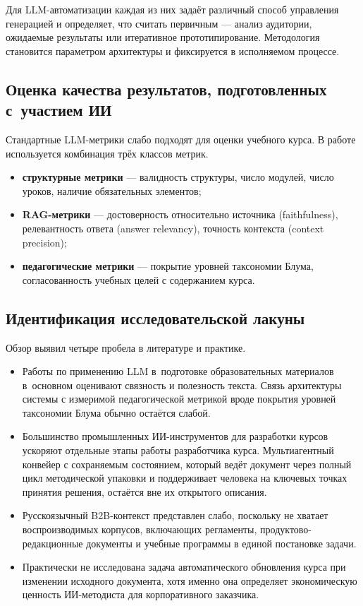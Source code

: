 Для LLM-автоматизации каждая из них задаёт различный способ управления
генерацией и определяет, что считать первичным — анализ аудитории,
ожидаемые результаты или итеративное прототипирование.
Методология становится параметром архитектуры и фиксируется в исполняемом процессе.

\subsection{Оценка качества результатов, подготовленных с~участием ИИ}

Стандартные LLM-метрики слабо подходят для оценки
учебного курса. В работе используется комбинация трёх классов метрик.

\begin{itemize}
  \item \textbf{структурные метрики} — валидность структуры, число модулей,
    число уроков, наличие обязательных элементов;
  \item \textbf{RAG-метрики} — достоверность относительно источника
    (faithfulness), релевантность ответа (answer relevancy),
    точность контекста (context precision);
  \item \textbf{педагогические метрики} — покрытие уровней таксономии
    Блума, согласованность учебных целей с содержанием курса.
\end{itemize}

\subsection{Идентификация исследовательской лакуны}

Обзор выявил четыре пробела в литературе и практике.

\begin{itemize}
  \item Работы по применению LLM в~подготовке образовательных материалов в~основном
    оценивают связность и полезность текста. Связь архитектуры системы
    с измеримой педагогической метрикой вроде покрытия уровней таксономии
    Блума обычно остаётся слабой.
  \item Большинство промышленных ИИ-инструментов для разработки курсов
    ускоряют отдельные этапы работы разработчика курса. Мультиагентный
    конвейер с сохраняемым состоянием, который ведёт документ через полный цикл
    методической упаковки и поддерживает человека на ключевых точках принятия решения,
    остаётся вне их открытого описания.
  \item Русскоязычный B2B-контекст представлен слабо, поскольку не хватает
    воспроизводимых корпусов, включающих регламенты, продуктово-редакционные
    документы и учебные программы в единой постановке задачи.
  \item Практически не исследована задача автоматического обновления курса
    при изменении исходного документа, хотя именно она определяет
    экономическую ценность ИИ-методиста для корпоративного заказчика.
\end{itemize}

